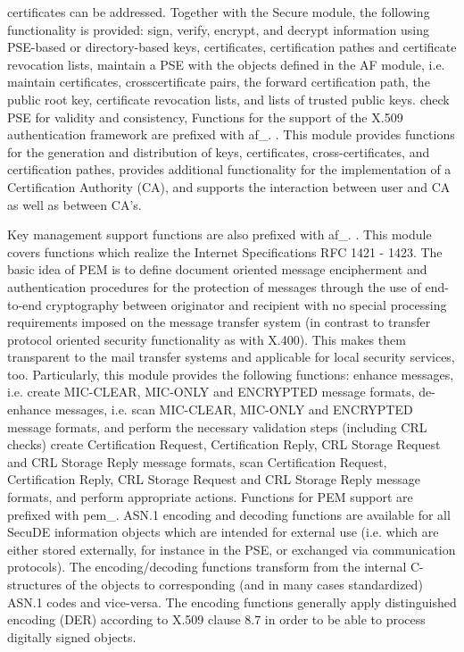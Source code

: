    certificates can be addressed. Together with the Secure module, the
   following functionality is provided:
   \bi
   \m sign, verify, encrypt, and decrypt information using PSE-based or 
      directory-based keys, certificates, certification pathes and 
      certificate revocation lists,
   \m maintain a PSE with the objects defined in the AF 
      module, i.e. maintain certificates, crosscertificate pairs,
      the forward certification path, the public root key,
      certificate revocation lists, and lists of trusted public keys.
   \m check PSE for validity and consistency,
   \ei
   Functions for the support of the X.509 authentication framework are
   prefixed with af\_.
. 
   This module provides functions for the ge\-ne\-ra\-tion and distribution
   of keys, certificates,
   cross-certificates, and certification pathes, provides additional
   functionality for the 
   implementation of a Certification Authority (CA), and supports the
   interaction between user and CA
   as well as between CA's.

   Key management support functions are also prefixed with af\_. 
. This module covers functions 
   which realize the Internet Specifications RFC 1421 - 1423. 
   The basic idea of PEM is to define document oriented message 
   encipherment and authentication procedures for the protection of 
   messages through the use of 
   end-to-end cryptography between originator and recipient with no special
   processing
   requirements imposed on the message transfer system (in contrast to
   transfer 
   protocol oriented security functionality as with X.400). This makes them
   transparent to the mail 
   transfer systems and applicable for local security services, too. 
   Particularly, this module provides the following functions:
   \bi
   \m enhance messages, i.e. create MIC-CLEAR, MIC-ONLY and
      ENCRYPTED message formats,
   \m de-enhance messages, i.e. scan MIC-CLEAR, MIC-ONLY and
      ENCRYPTED message formats, and perform the necessary
      validation steps (including CRL checks)
   \m create Certification Request, Certification Reply, CRL Storage
      Request and CRL Storage Reply message formats,
   \m scan Certification Request, Certification Reply, CRL Storage
      Request and CRL Storage Reply message formats, and perform
      appropriate actions.
   \ei
   Functions for PEM support are prefixed with pem\_.
   ASN.1 encoding and decoding functions are available 
   for all SecuDE information objects which are intended for external
   use (i.e. which are either stored externally, for instance in the
   PSE, or exchanged via communication protocols). 
   The encoding/decoding functions
   transform from the internal C-structures of the objects to
   corresponding (and in many cases standardized) ASN.1 codes
   and vice-versa. The encoding functions generally apply distinguished encoding 
   (DER) according to X.509 clause 8.7 in order to be able to process 
   digitally signed objects.

